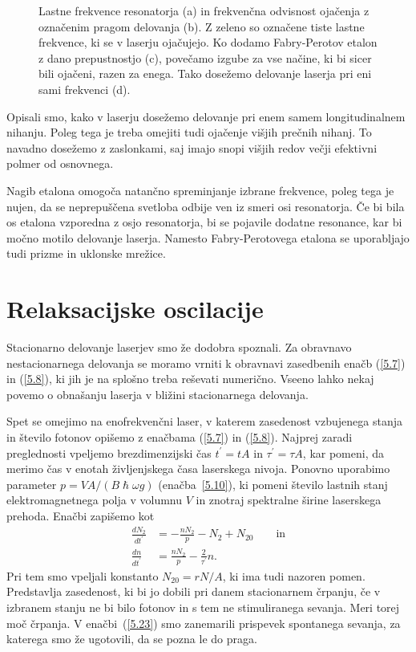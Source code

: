 \begin{figure}[h]
\centering
\def\svgwidth{80truemm} 

\caption{Lastne frekvence resonatorja (a) in frekvenčna odvisnost ojačenja z označenim 
pragom delovanja (b). Z zeleno so označene tiste lastne frekvence, ki se v laserju ojačujejo. 
Ko dodamo Fabry-Perotov etalon z dano prepustnostjo (c), povečamo
izgube za vse načine, ki bi sicer bili ojačeni, razen za enega. 
Tako dosežemo delovanje laserja pri eni sami frekvenci (d).}
\label{fig:FPmodes}
\end{figure}
Opisali smo, kako v laserju dosežemo delovanje pri enem samem longitudinalnem nihanju.
Poleg tega je treba omejiti tudi ojačenje višjih prečnih nihanj. To navadno 
dosežemo z zaslonkami, saj imajo snopi višjih redov večji efektivni polmer od osnovnega. 
\begin{remark}
Nagib etalona omogoča natančno spreminjanje izbrane frekvence, poleg tega
 je nujen, da se neprepuščena svetloba odbije ven iz smeri osi resonatorja. Če bi 
bila os etalona vzporedna z osjo resonatorja, bi se pojavile dodatne resonance, 
kar bi močno motilo delovanje laserja. Namesto Fabry-Perotovega etalona se uporabljajo
tudi prizme in uklonske mrežice.
\end{remark}

\section{Relaksacijske oscilacije}
Stacionarno delovanje laserjev smo že dodobra spoznali. Za obravnavo
nestacionarnega delovanja  se moramo vrniti k obravnavi zasedbenih enačb 
(\ref{5.7}) in (\ref{5.8}), ki jih je na splošno treba reševati numerično. 
Vseeno lahko nekaj povemo o obnašanju laserja
v bližini stacionarnega delovanja. 

Spet se omejimo na enofrekvenčni laser, v katerem zasedenost vzbujenega stanja
in število fotonov opišemo z enačbama (\ref{5.7})
in (\ref{5.8}). Najprej zaradi preglednosti vpeljemo
brezdimenzijski čas $t^{\prime}=t A$ in $\tau^{\prime}=\tau A$, kar pomeni, da merimo 
čas v enotah življenjskega časa laserskega nivoja. Ponovno uporabimo parameter
$p=VA/(B\hslash\omega g)$ (enačba~\ref{5.10}), ki pomeni število lastnih stanj 
elektromagnetnega polja v volumnu $V$ in znotraj spektralne širine laserskega prehoda. 
Enačbi zapišemo kot
\begin{align}  
\frac{d N_2}{d t^{\prime}}&=-\frac{nN_2}{p}-N_2+N_{20} \label{5.23a} \qquad \mathrm{in}\\
\frac{d n}{d t^{\prime}}& =  \frac{nN_2}{p}-\frac{2}{\tau^{\prime}}n.
\label{5.23}
\end{align}
Pri tem smo vpeljali konstanto $N_{20}= rN/A$, ki ima tudi nazoren pomen.
Predstavlja zasedenost, ki bi jo dobili pri danem stacionarnem črpanju, če v
izbranem stanju ne bi bilo fotonov in s tem ne stimuliranega sevanja. Meri torej 
moč črpanja. V enačbi~(\ref{5.23})
smo zanemarili prispevek spontanega sevanja, za katerega smo že ugotovili,
da se pozna le do praga.

